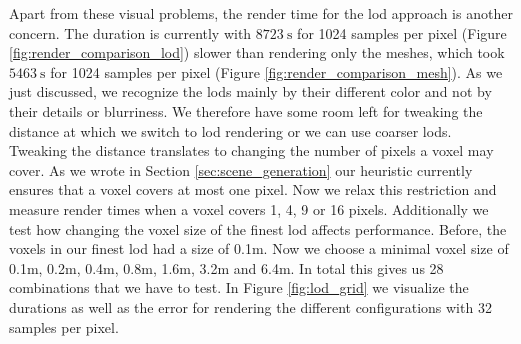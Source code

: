 Apart from these visual problems, the render time for the \ac{lod} approach is another concern.
The duration is currently with $\SI{8723}{\s}$ for 1024 samples per pixel (Figure \ref{fig:render_comparison_lod}) slower than rendering only the meshes, which took $\SI{5463}{\s}$ for 1024 samples per pixel (Figure \ref{fig:render_comparison_mesh}).
As we just discussed, we recognize the \acsp{lod} mainly by their different color and not by their details or blurriness.
We therefore have some room left for tweaking the distance at which we switch to \ac{lod} rendering or we can use coarser \acsp{lod}.
Tweaking the distance translates to changing the number of pixels a voxel may cover.
As we wrote in Section \ref{sec:scene_generation} our heuristic currently ensures that a voxel covers at most one pixel.
Now we relax this restriction and measure render times when a voxel covers 1, 4, 9 or 16 pixels.
Additionally we test how changing the voxel size of the finest \ac{lod} affects performance.
Before, the voxels in our finest \ac{lod} had a size of 0.1m.
Now we choose a minimal voxel size of 0.1m, 0.2m, 0.4m, 0.8m, 1.6m, 3.2m and 6.4m.
In total this gives us 28 combinations that we have to test.
In Figure \ref{fig:lod_grid} we visualize the durations as well as the \FLIP error for rendering the different configurations with 32 samples per pixel.
